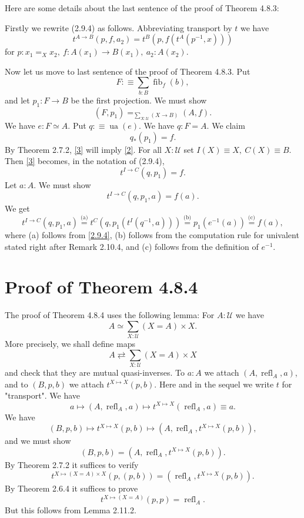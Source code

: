 \documentclass[12pt]{article}
\newcommand{\oo}{\operatorname}
\newcommand{\U}{\mathcal U}
\begin{document}
Here are some details about the last sentence of the proof of Theorem 4.8.3:

Firstly we rewrite (2.9.4) as follows. Abbreviating transport by $t$ we have 
\begin{equation}\label{2.9.4}
t^{A\to B}(p,f,a_2)=t^B(p,f(t^A(p^{-1},x)))
\end{equation}
for $p:x_1=_Xx_2,\ f:A(x_1)\to B(x_1),\ a_2:A(x_2)$. 

Now let us move to last sentence of the proof of Theorem 4.8.3. Put
$$
F:\equiv\sum_{b:B}\oo{fib}_f(b),
$$ 
and let $p_1:F\to B$ be the first projection. We must show 
\begin{equation}\label{2}
(F,p_1)=_{\sum_{X:\U}(X\to B)}(A,f).
\end{equation} 
We have $e:F\simeq A$. Put $q:\equiv\oo{ua}(e)$. We have $q:F=A$. We claim 
\begin{equation}\label{3}
q_*(p_1)=f.
\end{equation} 
By Theorem 2.7.2, \eqref{3} will imply \eqref{2}. For all $X:\U$ set $I(X)\equiv X,\ C(X)\equiv B$. Then \eqref{3} becomes, in the notation of (2.9.4), 
$$
t^{I\to C}(q,p_1)=f.
$$ 
Let $a:A$. We must show 
$$
t^{I\to C}(q,p_1,a)=f(a).
$$ 
We get 
$$
t^{I\to C}(q,p_1,a)\overset{\text{(a)}}=t^C(q,p_1(t^I(q^{-1},a)))\overset{\text{(b)}}=p_1(e^{-1}(a))\overset{\text{(c)}}=f(a),
$$ 
where (a) follows from \eqref{2.9.4}, (b) follows from the computation rule for univalent stated right after Remark 2.10.4, and (c) follows from the definition of $e^{-1}$.


\section{Proof of Theorem 4.8.4}

The proof of Theorem 4.8.4 uses the following lemma: For $A:\U$ we have 
$$
A\simeq\sum_{X:\U}(X=A)\times X.
$$
More precisely, we shall define maps 
$$
A\rightleftarrows\sum_{X:\U}(X=A)\times X
$$ 
and check that they are mutual quasi-inverses. To $a:A$ we attach $(A,\oo{refl}_A,a)$, and to $(B,p,b)$ we attach $t^{X\mapsto X}(p,b)$. Here and in the sequel we write $t$ for "transport". We have 
$$
a\mapsto(A,\oo{refl}_A,a)\mapsto t^{X\mapsto X}(\oo{refl}_A,a)\equiv a.
$$ 
We have 
$$
(B,p,b)\mapsto t^{X\mapsto X}(p,b)\mapsto(A,\oo{refl}_A,t^{X\mapsto X}(p,b)),
$$ 
and we must show 
$$
(B,p,b)=(A,\oo{refl}_A,t^{X\mapsto X}(p,b)).
$$ 
By Theorem 2.7.2 it suffices to verify 
$$
t^{X\mapsto (X=A)\times X}(p,(p,b))=(\oo{refl}_A,t^{X\mapsto X}(p,b)).
$$ 
By Theorem 2.6.4 it suffices to prove 
$$
t^{X\mapsto (X=A)}(p,p)=\oo{refl}_A.
$$ 
But this follows from Lemma 2.11.2.
\end{document}
